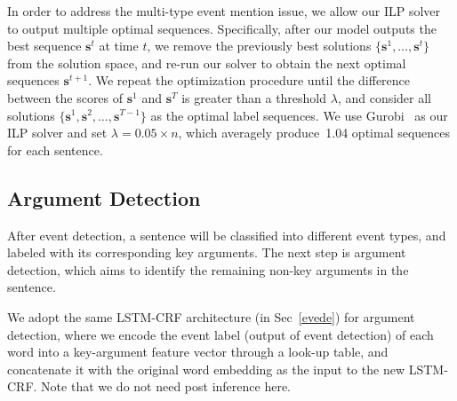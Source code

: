 In order to address the multi-type event mention issue, we allow our ILP solver to output multiple optimal sequences. 
Specifically, after our model outputs the best sequence $\bm{s}^t$ at time  $t$, we remove the previously best solutions 
 $\{\bm{s}^1, \ldots, \bm{s}^{t}\}$ from the solution space, and re-run our solver to obtain the next optimal sequences $\bm{s}^{t+1}$. 
We repeat the optimization procedure until the difference between the scores of $\bm{s}^1$ and $\bm{s}^T$ is greater 
than a threshold $\lambda$, and consider all solutions $\{\bm{s}^1, \bm{s}^2, \ldots, \bm{s}^{T-1}\}$ as the optimal label sequences. 
We use Gurobi~\cite{gurobi} as our ILP solver and set $\lambda=0.05 \times n$, which averagely produce~1.04 optimal sequences for each sentence. 

\subsection{Argument Detection}
After event detection, a sentence will be classified into different event types, and labeled with its corresponding key arguments. The next step is argument detection, which aims to identify the remaining non-key arguments in the sentence.  

We adopt the same LSTM-CRF architecture (in Sec~\ref{evede}) for argument detection, where we encode the event label (output of event detection) of each word into a key-argument feature vector through a look-up table, and concatenate it with the original word embedding as the input to the new LSTM-CRF. Note that we do not need post inference here.
